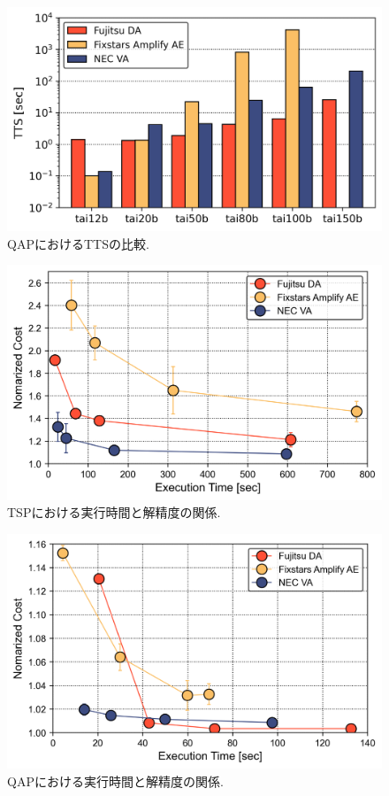 \documentclass[submit,techrep,noauthor]{ipsj}
\begin{document}
\begin{figure}[hb]
\centering
\includegraphics[bb=0 0 700 250, width=15cm]{TTS_QAP.png}
\caption{QAPにおけるTTSの比較.}
\label{QAP_TTS}
\end{figure}

\begin{figure}[hb]
\centering
\includegraphics[bb=0 0 700 250, width=15cm]{Energy_TSP.png}
\caption{TSPにおける実行時間と解精度の関係.}
\label{TSP_Time_Cost}
\end{figure}

\begin{figure}[hb]
\centering
\includegraphics[bb=0 0 700 250, width=15cm]{Energy_QAP.png}
\caption{QAPにおける実行時間と解精度の関係.}
\label{QAP_Time_Cost}
\end{figure}
\end{document}
